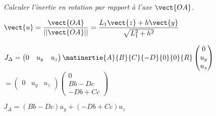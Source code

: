 \begin{multicols}{2}
\subparagraph{}\textit{Calculer l’inertie en rotation par rapport à l’axe $\vect{OA}$.}
\ifprof \begin{corrige}
$\vect{u}=\dfrac{\vect{OA}}{||\vect{OA}||}=\dfrac{L_1\vect{z}+h\vect{y}}{\sqrt{L_1^2+h^2}}$

$J_{\Delta}=\begin{pmatrix} 0 & u_y &  u_z \end{pmatrix} \matinertie{A}{B}{C}{-D}{0}{0}{R}
\begin{pmatrix} 0 \\ u_y \\  u_z \end{pmatrix}$
$=\begin{pmatrix} 0 & u_y &  u_z \end{pmatrix} 
\begin{pmatrix} 0 \\ Bb-Dc \\  -Db +Cc \end{pmatrix}$

$J_{\Delta}= \left( Bb-Dc\right)u_y + \left( -Db +Cc\right)u_z$

\end{corrige}\else\fi



\ifprof
\else
\end{multicols}
\fi
%
%
%
%
%
%
%


%